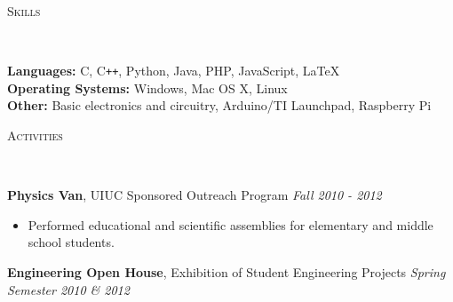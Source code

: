 \documentclass{article}
\newenvironment{changemargin}[2]{%
  \begin{list}{}{%
    \setlength{\topsep}{0pt}%
    \setlength{\leftmargin}{#1}%
    \setlength{\rightmargin}{#2}%
    \setlength{\listparindent}{\parindent}%
    \setlength{\itemindent}{\parindent}%
    \setlength{\parsep}{\parskip}%
  }%
  \item[]}{\end{list}
}
\newcommand{\lineover}{
	\begin{changemargin}{-0.05in}{-0.05in}
		\vspace*{-8pt}
		\hrulefill \\
		\vspace*{-2pt}
	\end{changemargin}
}
\newcommand{\header}[1]{
	\begin{changemargin}{-0.5in}{-0.5in}
		\scshape{#1}\\
  	\lineover
	\end{changemargin}
}
\newenvironment{body} {
	\vspace*{-16pt}
	\begin{changemargin}{-0.25in}{-0.5in}
  }	
	{\end{changemargin}
}
\begin{document}
\smallskip

\header{Skills}

\begin{body}
	\vspace{14pt}
	\textbf{Languages:}{} C, C{}\verb!++!, Python, Java, PHP, JavaScript, \LaTeX \\
	\textbf{Operating Systems:}{} Windows, Mac OS X, Linux\\
	\textbf{Other:}{} Basic electronics and circuitry, Arduino/TI Launchpad, Raspberry Pi\\
\end{body}

\smallskip


\header{Activities}

\begin{body}
	\vspace{14pt}
	\textbf{Physics Van}, UIUC Sponsored Outreach Program \hfill{} \emph{Fall 2010 - 2012}\\
	\begin{itemize} \itemsep -0pt  %
		\item Performed educational and scientific assemblies for elementary and middle school students.
	\end{itemize}	
	\smallskip
	\textbf{Engineering Open House}, Exhibition of Student Engineering Projects \hfill{} \emph{Spring Semester 2010 \& 2012}\\
\end{body}


\end{document}

